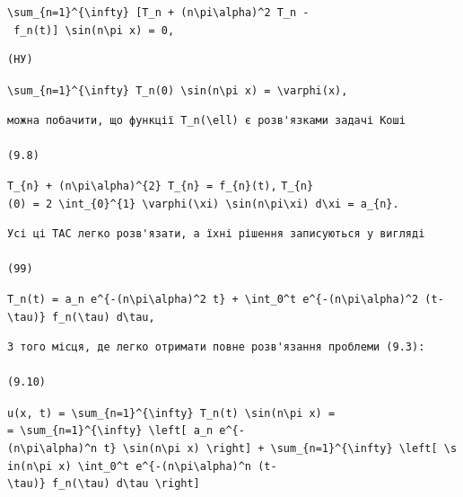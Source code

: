 \documentclass[
  ukrainian,
]{article}
\begin{document}
\texttt{\textbackslash{}sum\_\{n=1\}\^{}\{\textbackslash{}infty\}\ {[}T\textquotesingle{}\_n\ +\ (n\textbackslash{}pi\textbackslash{}alpha)\^{}2\ T\_n\ -\ f\_n(t){]}\ \textbackslash{}sin(n\textbackslash{}pi\ x)\ =\ 0,}

\begin{verbatim}
(НУ)
\end{verbatim}

\texttt{\textbackslash{}sum\_\{n=1\}\^{}\{\textbackslash{}infty\}\ T\_n(0)\ \textbackslash{}sin(n\textbackslash{}pi\ x)\ =\ \textbackslash{}varphi(x),}

\begin{verbatim}
можна побачити, що функції T_n(\ell) є розв'язками задачі Коші

(9.8)
\end{verbatim}

\texttt{T\_\{n\}\ +\ (n\textbackslash{}pi\textbackslash{}alpha)\^{}\{2\}\ T\_\{n\}\ =\ f\_\{n\}(t),}
\texttt{T\_\{n\}(0)\ =\ 2\ \textbackslash{}int\_\{0\}\^{}\{1\}\ \textbackslash{}varphi(\textbackslash{}xi)\ \textbackslash{}sin(n\textbackslash{}pi\textbackslash{}xi)\ d\textbackslash{}xi\ =\ a\_\{n\}.}

\begin{verbatim}
Усі ці TAC легко розв'язати, а їхні рішення записуються у вигляді

(99)
\end{verbatim}

\texttt{T\_n(t)\ =\ a\_n\ e\^{}\{-(n\textbackslash{}pi\textbackslash{}alpha)\^{}2\ t\}\ +\ \textbackslash{}int\_0\^{}t\ e\^{}\{-(n\textbackslash{}pi\textbackslash{}alpha)\^{}2\ (t-\textbackslash{}tau)\}\ f\_n(\textbackslash{}tau)\ d\textbackslash{}tau,}

\begin{verbatim}
З того місця, де легко отримати повне розв'язання проблеми (9.3):

(9.10)
\end{verbatim}

\texttt{u(x,\ t)\ =\ \textbackslash{}sum\_\{n=1\}\^{}\{\textbackslash{}infty\}\ T\_n(t)\ \textbackslash{}sin(n\textbackslash{}pi\ x)\ =}
\texttt{=\ \textbackslash{}sum\_\{n=1\}\^{}\{\textbackslash{}infty\}\ \textbackslash{}left{[}\ a\_n\ e\^{}\{-(n\textbackslash{}pi\textbackslash{}alpha)\^{}n\ t\}\ \textbackslash{}sin(n\textbackslash{}pi\ x)\ \textbackslash{}right{]}\ +\ \textbackslash{}sum\_\{n=1\}\^{}\{\textbackslash{}infty\}\ \textbackslash{}left{[}\ \textbackslash{}sin(n\textbackslash{}pi\ x)\ \textbackslash{}int\_0\^{}t\ e\^{}\{-(n\textbackslash{}pi\textbackslash{}alpha)\^{}n\ (t-\textbackslash{}tau)\}\ f\_n(\textbackslash{}tau)\ d\textbackslash{}tau\ \textbackslash{}right{]}}
\end{document}
